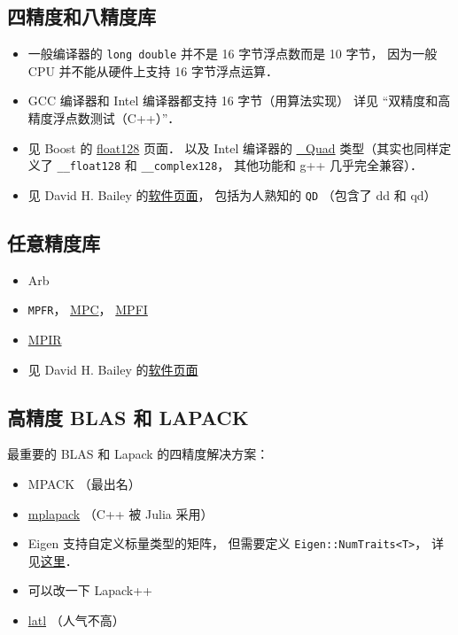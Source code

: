 
\begin{issues}
\issueDraft
\end{issues}

\subsection{四精度和八精度库}
\begin{itemize}
\item 一般编译器的 \verb|long double| 并不是 16 字节浮点数而是 10 字节， 因为一般 CPU 并不能从硬件上支持 16 字节浮点运算．
\item GCC 编译器和 Intel 编译器都支持 16 字节（用算法实现） 详见 “双精度和高精度浮点数测试（C++）”．
\item 见 Boost 的 \href{https://www.boost.org/doc/libs/develop/libs/multiprecision/doc/html/boost_multiprecision/tut/floats/float128.html}{float128} 页面． 以及 Intel 编译器的 \href{https://community.intel.com/t5/Intel-C-Compiler/Quad-precision-Quad-data-type/td-p/1218636}{\_Quad} 类型（其实也同样定义了 \verb|__float128| 和 \verb|__complex128|， 其他功能和 g++ 几乎完全兼容）．
\item 见 David H. Bailey 的\href{https://www.davidhbailey.com/dhbsoftware/}{软件页面}， 包括为人熟知的 \verb|QD| （包含了 dd 和 qd）
\end{itemize}

\subsection{任意精度库}
\begin{itemize}
\item Arb
\item \verb|MPFR|， \href{https://www.multiprecision.org/mpc/}{MPC}， \href{http://perso.ens-lyon.fr/nathalie.revol/software.html}{MPFI}
\item \href{https://mpir.org/downloads.html}{MPIR}
\item 见 David H. Bailey 的\href{https://www.davidhbailey.com/dhbsoftware/}{软件页面}
\end{itemize}


\subsection{高精度 BLAS 和 LAPACK}
最重要的 BLAS 和 Lapack 的四精度解决方案：
\begin{itemize}
\item MPACK （最出名）
\item \href{https://github.com/nakatamaho/mplapack}{mplapack} （C++ 被 Julia 采用）
\item Eigen 支持自定义标量类型的矩阵， 但需要定义 \verb|Eigen::NumTraits<T>|， 详见\href{https://eigen.tuxfamily.org/dox/TopicCustomizing_CustomScalar.html}{这里}．
\item 可以改一下 Lapack++
\item \href{https://github.com/langou/latl}{latl} （人气不高）
\end{itemize}
